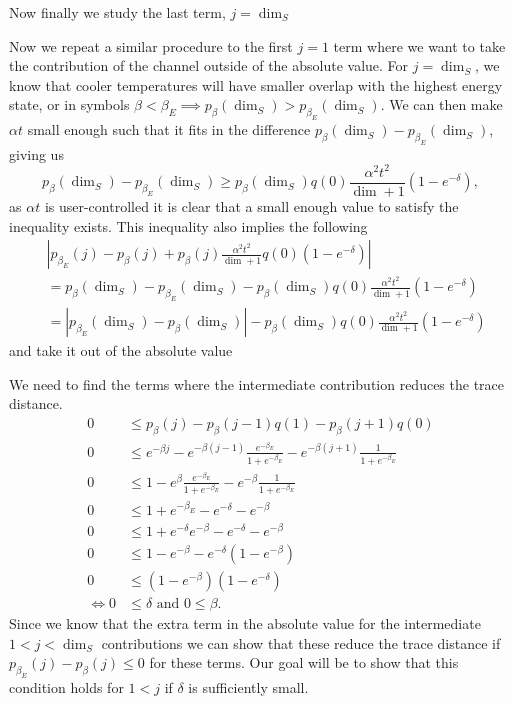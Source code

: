 \documentclass{article}
\newcommand{\abs}[1]{\left| #1 \right|}
\begin{document}
Now finally we study the last term, $j = \dim_S$



Now we repeat a similar procedure to the first $j = 1$ term where we want to take the contribution of the channel outside of the absolute value. For $j = \dim_S$, we know that cooler temperatures will have smaller overlap with the highest energy state, or in symbols $\beta < \beta_E \implies p_{\beta}(\dim_S) > p_{\beta_E}(\dim_S)$. We can then make $\alpha t$ small enough such that it fits in the difference $p_{\beta}(\dim_S) - p_{\beta_E}(\dim_S)$, giving us
$$
p_{\beta}(\dim_S) - p_{\beta_E}(\dim_S) \geq p_{\beta} (\dim_S) q(0) \frac{\alpha^2 t^2}{\dim + 1} (1 - e^{-\delta}),
$$
as $\alpha t$ is user-controlled it is clear that a small enough value to satisfy the inequality exists. This inequality also implies the following
\begin{align}
    &\left| p_{\beta_E}(j) - p_{\beta}(j) + p_{\beta}(j) \frac{\alpha^2 t^2}{\dim + 1}  q(0)(1 - e^{-\delta}) \right| \\
    &= p_{\beta}(\dim_S) - p_{\beta_E}(\dim_S) - p_{\beta}(\dim_S) q(0) \frac{\alpha^2 t^2}{\dim + 1}(1 - e^{-\delta}) \\
    &= \abs{p_{\beta_E}(\dim_S) - p_{\beta}(\dim_S)} - p_{\beta}(\dim_S) q(0) \frac{\alpha^2 t^2}{\dim + 1}(1 - e^{-\delta}) \label{eq:harmonic_osc_s_dim}
\end{align}
and take it out of the absolute value

We need to find the terms where the intermediate contribution reduces the trace distance.
\begin{align}
    0 &\leq p_{\beta}(j) - p_{\beta}(j-1) q(1) - p_{\beta}(j+1) q(0) \\
    0 &\leq e^{-\beta j} - e^{-\beta(j - 1)} \frac{e^{-\beta_E}}{1 + e^{-\beta_E}} - e^{-\beta(j+1)} \frac{1}{1 + e^{-\beta_E}} \\
    0 &\leq 1 - e^{\beta} \frac{e^{-\beta_E}}{1 + e^{-\beta_E}} - e^{-\beta} \frac{1}{1 + e^{-\beta_E}} \\
    0&\leq 1 + e^{-\beta_E} -e^{-\delta} - e^{-\beta} \\
    0 &\leq 1 + e^{-\delta} e^{-\beta} - e^{-\delta } - e^{-\beta} \\
    0 &\leq 1 - e^{-\beta} - e^{-\delta} (1 - e^{-\beta}) \\
    0 &\leq (1-e^{-\beta})(1 - e^{-\delta}) \\
    \iff 0 &\leq \delta \text{ and } 0 \leq \beta.
\end{align}
Since we know that the extra term in the absolute value for the intermediate $1 < j < \dim_S$ contributions we can show that these reduce the trace distance if $p_{\beta_E}(j) - p_{\beta}(j) \leq 0$ for these terms. Our goal will be to show that this condition holds for $1 < j$ if $\delta$ is sufficiently small. 
\end{document}
